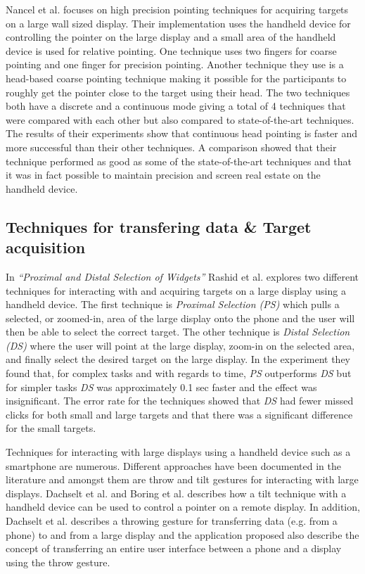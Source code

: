 Nancel et al. \cite{Nancel:2013} focuses on high precision pointing techniques for acquiring targets on a large wall sized display.
Their implementation uses the handheld device for controlling the pointer on the large display and a small area of the handheld device is used for relative pointing.
One technique uses two fingers for coarse pointing and one finger for precision pointing. 
Another technique they use is a head-based coarse pointing technique making it possible for the participants to roughly get the pointer close to the target using their head.
The two techniques both have a discrete and a continuous mode giving a total of 4 techniques that  were compared with each other but also compared to state-of-the-art techniques.
The results of their experiments show that continuous head pointing is faster and more successful than their other techniques.
A comparison showed that their technique performed as good as some of the state-of-the-art techniques and that it was in fact possible to maintain precision and screen real estate on the handheld device.

\subsection{Techniques for transfering data \& Target acquisition} \label{sec:targetAcquisition}
In \emph{``Proximal and Distal Selection of Widgets''} Rashid et al. \cite{Rashid:2011} explores two different techniques for interacting with and acquiring targets on a large display using a handheld device.
The first technique is \emph{Proximal Selection (PS)} which pulls a selected, or zoomed-in, area of the large display onto the phone and the user will then be able to select the correct target.
The other technique is \emph{Distal Selection (DS)} where the user will point at the large display, zoom-in on the selected area, and finally select the desired target on the large display.
In the experiment they found that, for complex tasks and with regards to time, \emph{PS} outperforms \emph{DS} but for simpler tasks \emph{DS} was approximately 0.1 sec faster and the effect was insignificant.
The error rate for the techniques showed that \emph{DS} had fewer missed clicks for both small and large targets and that there was a significant difference for the small targets.

Techniques for interacting with large displays using a handheld device such as a smartphone are numerous.
Different approaches have been documented in the literature and amongst them are throw and tilt gestures for interacting with large displays.
Dachselt et al. \cite{Dachselt:2008} and Boring et al. \cite{Boring:2009} describes how a tilt technique with a handheld device can be used to control a pointer on a remote display.
In addition, Dachselt et al. describes a throwing gesture for transferring data (e.g. from a phone) to and from a large display and the application proposed also describe the concept of transferring an entire user interface between a phone and a display using the throw gesture.